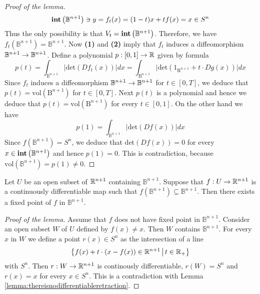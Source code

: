 \begin{proof}[Proof of the lemma]
$$\mathbf{int}\left(\mathbb{B}^{n+1}\right) \ni y = f_t(x) = (1-t)x + tf(x) = x \in S^n$$
Thus the only possibility is that $V_t = \mathbf{int}\left(\mathbb{B}^{n+1}\right)$. Therefore, we have $f_t(\mathbb{B}^{n+1}) = \mathbb{B}^{n+1}$. Now \textbf{(1)} and \textbf{(2)} imply that $f_t$ induces a diffeomorphism $\mathbb{B}^{n+1}\rightarrow \mathbb{B}^{n+1}$. Define a polynomial $p:[0,1]\rightarrow {\mathbb R}$ given by formula
$$p(t) = \int_{\mathbb{B}^{n+1}}\big|\mathrm{det}\left(Df_t(x)\right)\big|dx = \int_{\mathrm{B}^{n+1}}\big|\mathrm{det}\left(1_{\mathrm{R}^{n+1}} + t\cdot Dg(x)\right)\big|dx$$
Since $f_t$ induces a diffeomorphism $\mathbb{B}^{n+1}\rightarrow \mathbb{B}^{n+1}$ for $t\in [0,T]$, we deduce that $p(t) = \mathrm{vol}\left(\mathrm{B}^{n+1}\right)$ for $t\in [0,T]$. Next $p(t)$ is a polynomial and hence we deduce that $p(t) = \mathrm{vol}\left(\mathrm{B}^{n+1}\right)$ for every $t\in [0,1]$. On the other hand we have
$$p(1) = \int_{\mathbb{B}^{n+1}}\big|\mathrm{det}\left(Df(x)\right)\big|dx$$
Since $f(\mathbb{B}^{n+1}) = S^n$, we deduce that $\mathrm{det}\left(Df(x)\right)=0$ for every $x\in \mathbf{int}\left(\mathbb{B}^{n+1}\right)$ and hence $p(1) = 0$. This is contradiction, because $\mathrm{vol}\left(\mathbb{B}^{n+1}\right) = p(1) \neq 0$.
\end{proof}

\begin{lemma}\label{lemma:everycontinuouslydifferentiableadmitsafixedpoint}
Let $U$ be an open subset of ${\mathbb R}^{n+1}$ containing $\mathbb{B}^{n+1}$. Suppose that $f:U\rightarrow {\mathbb R}^{n+1}$ is a continuously differentiable map such that $f(\mathbb{B}^{n+1})\subseteq \mathbb{B}^{n+1}$. Then there exists a fixed point of $f$ in $\mathbb{B}^{n+1}$.
\end{lemma}
\begin{proof}[Proof of the lemma]
Assume that $f$ does not have fixed point in $\mathbb{B}^{n+1}$. Consider an open subset $W$ of $U$ defined by $f(x) \neq x$. Then $W$ contains $\mathbb{B}^{n+1}$. For every $x$ in $W$ we define a point $r(x)\in S^n$ as the intersection of a line
$$\big\{f(x) + t\cdot \left(x - f(x)\right)\in {\mathbb R}^{n+1}\,\big|\,t\in {\mathbb R}_+\big\}$$
with $S^n$. Then $r:W\rightarrow {\mathbb R}^{n+1}$ is continously differentiable, $r(W) = S^n$ and $r(x) = x$ for every $x\in S^n$. This is a contradiction with Lemma \ref{lemma:thereisnodifferentiableretraction}.
\end{proof}

